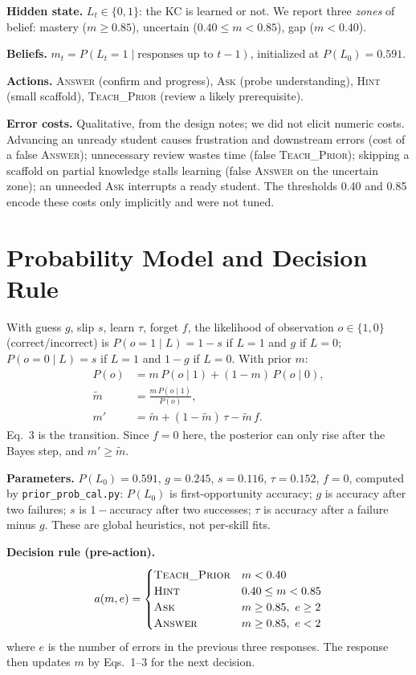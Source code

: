 \documentclass[10pt,twocolumn,letterpaper]{article}
\begin{document}
\textbf{Hidden state.} $L_t\in\{0,1\}$: the KC is learned or not. We report three \emph{zones} of belief: mastery ($m\ge 0.85$), uncertain ($0.40\le m<0.85$), gap ($m<0.40$).

\textbf{Beliefs.} $m_t=P(L_t=1\mid \text{responses up to } t-1)$, initialized at $P(L_0)=0.591$.

\textbf{Actions.} \textsc{Answer} (confirm and progress), \textsc{Ask} (probe understanding), \textsc{Hint} (small scaffold), \textsc{Teach\_Prior} (review a likely prerequisite).

\textbf{Error costs.} Qualitative, from the design notes; we did not elicit numeric costs. Advancing an unready student causes frustration and downstream errors (cost of a false \textsc{Answer}); unnecessary review wastes time (false \textsc{Teach\_Prior}); skipping a scaffold on partial knowledge stalls learning (false \textsc{Answer} on the uncertain zone); an unneeded \textsc{Ask} interrupts a ready student. The thresholds 0.40 and 0.85 encode these costs only implicitly and were not tuned.

\section{Probability Model and Decision Rule}\label{sec:model}
With guess $g$, slip $s$, learn $\tau$, forget $f$, the likelihood of observation $o\in\{1,0\}$ (correct/incorrect) is
$P(o{=}1\mid L)=1-s$ if $L=1$ and $g$ if $L=0$; $P(o{=}0\mid L)=s$ if $L=1$ and $1-g$ if $L=0$. With prior $m$:
\begin{align}
P(o) &= m\,P(o\mid 1)+(1-m)\,P(o\mid 0),\\
\tilde m &= \frac{m\,P(o\mid 1)}{P(o)},\\
m' &= \tilde m+(1-\tilde m)\,\tau-\tilde m\,f.
\end{align}
Eq.~3 is the transition. Since $f=0$ here, the posterior can only rise after the Bayes step, and $m'\ge \tilde m$.

\textbf{Parameters.} $P(L_0)=0.591$, $g=0.245$, $s=0.116$, $\tau=0.152$, $f=0$, computed by \texttt{prior\_prob\_cal.py}: $P(L_0)$ is first-opportunity accuracy; $g$ is accuracy after two failures; $s$ is $1-$accuracy after two successes; $\tau$ is accuracy after a failure minus $g$. These are global heuristics, not per-skill fits.

\textbf{Decision rule (pre-action).}
\begin{equation}
a(m,e)=\begin{cases}
\textsc{Teach\_Prior} & m<0.40\\
\textsc{Hint} & 0.40\le m<0.85\\
\textsc{Ask} & m\ge 0.85,\ e\ge 2\\
\textsc{Answer} & m\ge 0.85,\ e<2
\end{cases}
\end{equation}
where $e$ is the number of errors in the previous three responses. The response then updates $m$ by Eqs.~1--3 for the next decision.
\end{document}

